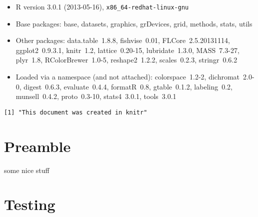 \documentclass[a4paper]{article}\usepackage{graphicx, color}
\makeatletter
\newenvironment{kframe}{%
 \def\at@end@of@kframe{}%
 \ifinner\ifhmode%
  \def\at@end@of@kframe{\end{minipage}}%
  \begin{minipage}{\columnwidth}%
 \fi\fi%
 \def\FrameCommand##1{\hskip\@totalleftmargin \hskip-\fboxsep
 \colorbox{shadecolor}{##1}\hskip-\fboxsep
     \hskip-\linewidth \hskip-\@totalleftmargin \hskip\columnwidth}%
 \MakeFramed {\advance\hsize-\width
   \@totalleftmargin\z@ \linewidth\hsize
   \@setminipage}}%
 {\par\unskip\endMakeFramed%
 \at@end@of@kframe}
\newenvironment{knitrout}{}{} %
\makeatother
\begin{document}
\begin{itemize}\raggedright
  \item R version 3.0.1 (2013-05-16), \verb|x86_64-redhat-linux-gnu|
  \item Base packages: base, datasets, graphics, grDevices, grid,
    methods, stats, utils
  \item Other packages: data.table~1.8.8, fishvise~0.01,
    FLCore~2.5.20131114, ggplot2~0.9.3.1, knitr~1.2,
    lattice~0.20-15, lubridate~1.3.0, MASS~7.3-27, plyr~1.8,
    RColorBrewer~1.0-5, reshape2~1.2.2, scales~0.2.3,
    stringr~0.6.2
  \item Loaded via a namespace (and not attached):
    colorspace~1.2-2, dichromat~2.0-0, digest~0.6.3,
    evaluate~0.4.4, formatR~0.8, gtable~0.1.2, labeling~0.2,
    munsell~0.4.2, proto~0.3-10, stats4~3.0.1, tools~3.0.1
\end{itemize}



\begin{knitrout}
\color{fgcolor}\begin{kframe}
\begin{verbatim}
[1] "This document was created in knitr"
\end{verbatim}
\end{kframe}
\end{knitrout}

\newpage{}
\tableofcontents{}
\newpage{}

\section{Preamble}
some nice stuff
\section{Testing}
\newpage{}
\end{document}

